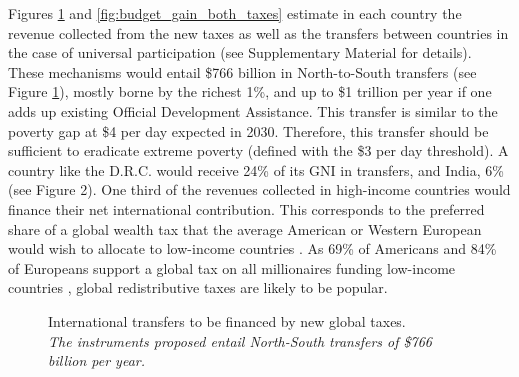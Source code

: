 \documentclass[12pt,english]{article}
\begin{document}
\begin{bibunit}
Figures \ref{fig:gain_both_taxes} and \ref{fig:budget_gain_both_taxes} estimate in each country the revenue collected from the new taxes as well as the transfers between countries in the case of universal participation (see Supplementary Material for details). These mechanisms would entail \$766 billion in North-to-South transfers (see Figure \ref{fig:gain_both_taxes}), mostly borne by the richest 1\%, and up to \$1 trillion per year if one adds up existing Official Development Assistance. This transfer is similar to the poverty gap at \$4 per day expected in 2030. Therefore, this transfer should be sufficient to eradicate extreme poverty (defined with the \$3 per day threshold). A country like the D.R.C. would receive 24\% of its GNI in transfers, and India, 6\% (see Figure 2). One third of the revenues collected in high-income countries would finance their net international contribution. This corresponds to the preferred share of a global wealth tax that the average American or Western European would wish to allocate to low-income countries \citep{fabre_majority_2025}. As 69\% of Americans and 84\% of Europeans support a global tax on all millionaires funding low-income countries \citep{fabre_majority_2025}, global redistributive taxes are likely to be popular.
 
\begin{figure}[h!] 
    \caption{International transfers to be financed by new global taxes. \\ \textit{The instruments proposed entail North-South transfers of \$766 billion per year.}}\label{fig:gain_both_taxes}
\end{figure}


\end{bibunit}
\end{document}
